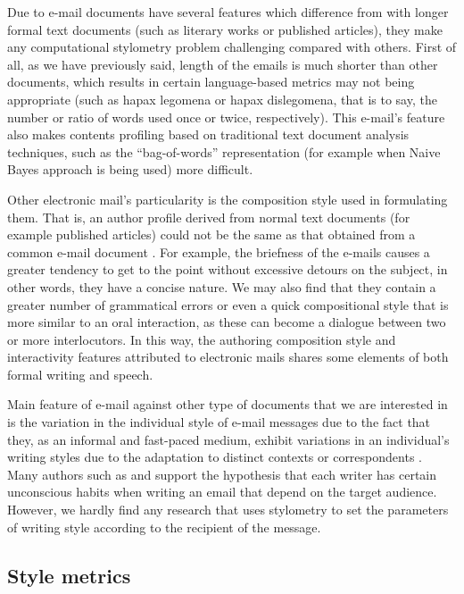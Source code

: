 Due to e-mail documents have several features which difference from with longer formal text documents (such as literary works or published articles), they make any computational stylometry problem challenging compared with others. First of all, as we have previously said, length of the emails is much shorter than other documents, which results in certain language-based metrics may not being appropriate (such as hapax legomena or hapax dislegomena, that is to say, the number or ratio of words used once or twice, respectively). This e-mail's feature also makes contents profiling based on traditional text document analysis techniques, such as the ``bag-of-words'' representation (for example when Naive Bayes approach is being used) more difficult.

Other electronic mail's particularity is the composition style used in formulating them. That is, an author profile derived from normal text documents (for example published articles) could not be the same as that obtained from a common e-mail document \citep{de2001mining}. For example, the briefness of the e-mails causes a greater tendency to get to the point without excessive detours on the subject, in other words, they have a concise nature. We may also find that they contain a greater number of grammatical errors or even a quick compositional style that is more similar to an oral interaction, as these can become a dialogue between two or more interlocutors. In this way, the authoring composition style and interactivity features attributed to electronic mails shares some elements of both formal writing and speech.

Main feature of e-mail against other type of documents that we are interested in is the variation in the individual style of e-mail messages due to the fact that they, as an informal and fast-paced medium, exhibit variations in an individual's writing styles due to the adaptation to distinct contexts or correspondents \citep{argamon2003style}. Many authors such as \cite{allen1974methods} and \cite{de2001mining} support the hypothesis that each writer has certain unconscious habits when writing an email that depend on the target audience. However, we hardly find any research that uses stylometry to set the parameters of writing style according to the recipient of the message.

\subsection{Style metrics}\label{ssect:stymet}

